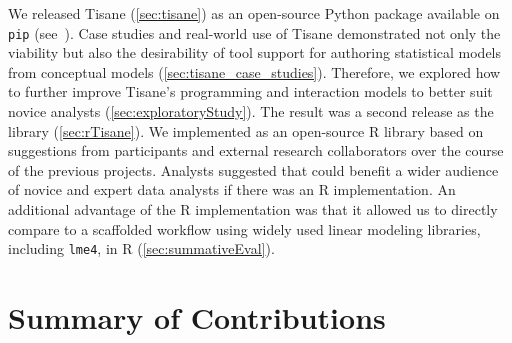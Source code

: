 We released Tisane (\autoref{sec:tisane}) as an open-source Python package
available on \texttt{pip} (see~\cite{tisaneWebsite}). Case studies and
real-world use of Tisane demonstrated not only the viability but also the
desirability of tool support for authoring statistical models from conceptual
models (\autoref{sec:tisane_case_studies}). Therefore, we explored how to
further improve Tisane's programming and interaction models to better suit
novice analysts (\autoref{sec:exploratoryStudy}). The result was a second
release as the \rTisane library \cite{jun2023rTisane} (\autoref{sec:rTisane}).
We implemented \rTisane as an open-source R library based on suggestions from
participants and external research collaborators over the course of the previous
projects. Analysts suggested that \tisane could benefit a wider audience of
novice and expert data analysts if there was an R implementation.
An additional advantage of the R implementation was that it allowed us to directly
compare \rTisane to a scaffolded workflow using widely used linear modeling
libraries, including \texttt{lme4}, in R (\autoref{sec:summativeEval}). 







\section{Summary of Contributions}


